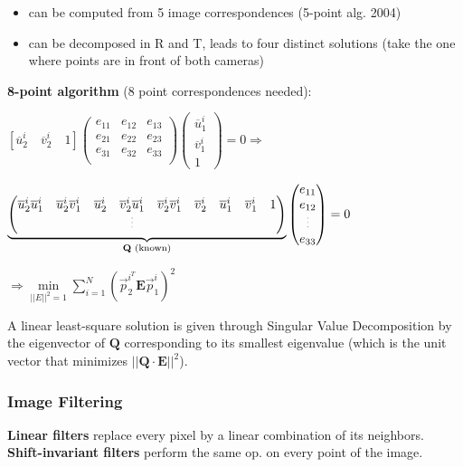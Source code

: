 \documentclass[fontsize=6pt]{scrartcl}
\newcommand{\mat}[1]{\mathbf{#1}}
\begin{document}
\begin{multicols*}{4}
\begin{itemize}
\item can be computed from 5 image correspondences (5-point alg. 2004)
\item can be decomposed in R and T, leads to four distinct solutions (take the one where points are in front of both cameras)
\end{itemize}

\textbf{8-point algorithm} (8 point correspondences needed): 

$
[\overline{u}_2^i \quad \overline{v}_2^i \quad 1]
\left(
\begin{smallmatrix}
e_{11} & e_{12} & e_{13}\\
e_{21} & e_{22} & e_{23}\\
e_{31} & e_{32} & e_{33}\\
\end{smallmatrix}
\right)
\begin{pmatrix}
\overline{u}_1^i \\
\overline{v}_1^i \\
1
\end{pmatrix}
= 0 \Rightarrow$

$
\underbrace{
\begin{pmatrix}
\overline{u}_2^i\overline{u}_1^i & \overline{u}_2^i\overline{v}_1^i & \overline{u}_2^i & \overline{v}_2^i\overline{u}_1^i  & \overline{v}_2^i\overline{v}_1^i & \overline{v}_2^i & \overline{u}_1^i & \overline{v}_1^i & 1\\
&&& \tiny{\vdots} &&&&&
\end{pmatrix}
}_{\mat Q \text{ (known)}}
\begin{pmatrix}
e_{11}\\
e_{12}\\
\tiny{\vdots}\\
e_{33}
\end{pmatrix}
= 0
$

$\Rightarrow \min\limits_{||E||^2=1} \sum\limits_{i=1}^N (\vec p_2^{i^{T}}\mat E \vec p_1^i)^2$

A linear least-square solution is given through Singular Value Decomposition by the eigenvector of $\mat Q$ corresponding to its smallest eigenvalue (which is the unit vector that minimizes $||\mat Q \cdot \mat E||^2$).

\subsubsection*{Image Filtering}

\textbf{Linear filters} replace every pixel by a linear combination of its neighbors. \textbf{Shift-invariant filters} perform the same op. on every point of the image.


\end{multicols*}
\end{document}
